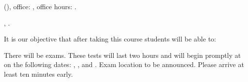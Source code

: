 \documentclass[letterpaper,12pt]{article}
\begin{document}
\title{\coursename}
\author{\semester}
\date{}
\maketitle

\instructor{} (\href{mailto:\instructoremail{}}{\instructoremail{}}),
office: \instructoroffice{},
office hours: \officehours{}.

\vspace{3mm}

 \classtime{}, \classlocation{}.

\vspace{3mm}


\vspace{3mm}


\vspace{3mm}


\vspace{3mm}

 It is our objective that after taking this course students will be able to:

\vspace{3mm}


\vspace{3mm}


\vspace{3mm}

 There will be \numexams{} exams.
These tests will last two hours and will begin promptly at \examtime{} on the following dates:
\firstexamdate{}, \secondexamdate{}, and \thirdexamdate{}.
Exam location to be announced.
Please arrive at least ten minutes early.

\vspace{3mm}


\vspace{3mm}


\vspace{3mm}

\end{document}
